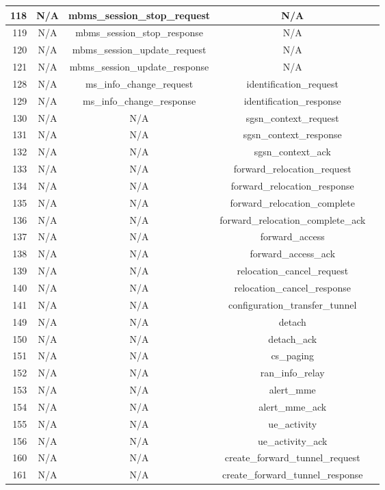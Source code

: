 \documentclass[english]{report}
\begin{document}
\begin{itemize}
\begin{longtable}{|r|c|c|c|p{13.5cm}|}
\hline
118 & N/A & mbms\_session\_stop\_request & N/A \\
\hline
119 & N/A & mbms\_session\_stop\_response & N/A \\
\hline
120 & N/A & mbms\_session\_update\_request & N/A \\
\hline
121 & N/A & mbms\_session\_update\_response & N/A \\
\hline
128 & N/A & ms\_info\_change\_request & identification\_request \\
\hline
129 & N/A & ms\_info\_change\_response & identification\_response \\
\hline
130 & N/A & N/A & sgsn\_context\_request \\
\hline
131 & N/A & N/A & sgsn\_context\_response \\
\hline
132 & N/A & N/A & sgsn\_context\_ack \\
\hline
133 & N/A & N/A & forward\_relocation\_request \\
\hline
134 & N/A & N/A & forward\_relocation\_response \\
\hline
135 & N/A & N/A & forward\_relocation\_complete \\
\hline
136 & N/A & N/A & forward\_relocation\_complete\_ack \\
\hline
137 & N/A & N/A & forward\_access \\
\hline
138 & N/A & N/A & forward\_access\_ack \\
\hline
139 & N/A & N/A & relocation\_cancel\_request \\
\hline
140 & N/A & N/A & relocation\_cancel\_response \\
\hline
141 & N/A & N/A & configuration\_transfer\_tunnel \\
\hline
149 & N/A & N/A & detach \\
\hline
150 & N/A & N/A & detach\_ack \\
\hline
151 & N/A & N/A & cs\_paging \\
\hline
152 & N/A & N/A & ran\_info\_relay \\
\hline
153 & N/A & N/A & alert\_mme \\
\hline
154 & N/A & N/A & alert\_mme\_ack \\
\hline
155 & N/A & N/A & ue\_activity \\
\hline
156 & N/A & N/A & ue\_activity\_ack \\
\hline
160 & N/A & N/A & create\_forward\_tunnel\_request \\
\hline
161 & N/A & N/A & create\_forward\_tunnel\_response \\

\end{longtable}
\end{itemize}
\end{document}
